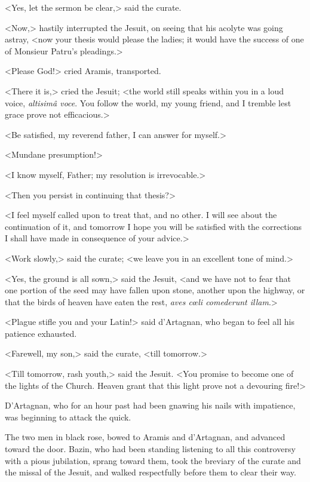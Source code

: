 <Yes, let the sermon be clear,> said the curate. 

<Now,> hastily interrupted the Jesuit, on seeing that his acolyte was going astray, <now your thesis would please the ladies; it would have the success of one of Monsieur Patru's pleadings.> 

<Please God!> cried Aramis, transported. 

<There it is,> cried the Jesuit; <the world still speaks within you in a loud voice, \textit{altisimâ voce}. You follow the world, my young friend, and I tremble lest grace prove not efficacious.> 

<Be satisfied, my reverend father, I can answer for myself.> 

<Mundane presumption!> 

<I know myself, Father; my resolution is irrevocable.> 

<Then you persist in continuing that thesis?> 

<I feel myself called upon to treat that, and no other. I will see about the continuation of it, and tomorrow I hope you will be satisfied with the corrections I shall have made in consequence of your advice.> 

<Work slowly,> said the curate; <we leave you in an excellent tone of mind.> 

<Yes, the ground is all sown,> said the Jesuit, <and we have not to fear that one portion of the seed may have fallen upon stone, another upon the highway, or that the birds of heaven have eaten the rest, \textit{aves cœli comederunt illam}.> 

<Plague stifle you and your Latin!> said d'Artagnan, who began to feel all his patience exhausted. 

<Farewell, my son,> said the curate, <till tomorrow.> 

<Till tomorrow, rash youth,> said the Jesuit. <You promise to become one of the lights of the Church. Heaven grant that this light prove not a devouring fire!> 

D'Artagnan, who for an hour past had been gnawing his nails with impatience, was beginning to attack the quick. 

The two men in black rose, bowed to Aramis and d'Artagnan, and advanced toward the door. Bazin, who had been standing listening to all this controversy with a pious jubilation, sprang toward them, took the breviary of the curate and the missal of the Jesuit, and walked respectfully before them to clear their way. 

